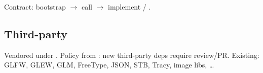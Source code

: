 Contract: bootstrap $\rightarrow$ call  $\rightarrow$ implement
 / .

\subsection{Third-party}
Vendored under . Policy from :
new third-party deps require review/PR. Existing: GLFW, GLEW, GLM, FreeType,
JSON, STB, Tracy, image libs, \ldots
